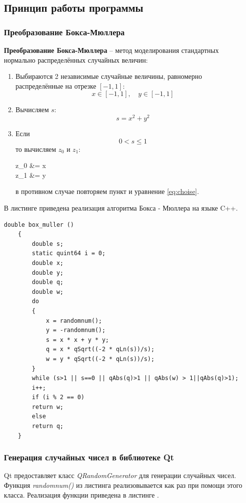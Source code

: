 \documentclass[../AISTR.tex]{subfiles}
\begin{document}
\subsection{Принцип работы программы}
\subsubsection{Преобразование Бокса-Мюллера}
\textbf{Преобразование Бокса-Мюллера} --  метод моделирования стандартных нормально распределённых случайных величин:
\begin{enumerate}
	\item \label{choise} Выбираются 2 независимые случайные величины, равномерно распределённые на отрезке $\left[-1, 1\right]$:
	\begin{equation}\label{eq:choise}
		x\in\left[-1, 1\right], \quad y\in\left[-1, 1\right]
	\end{equation}
	\item Вычисляем $s$:
	\begin{equation}
		s = x^2+y^2
	\end{equation}
	\item Если 
	\begin{equation}
		0<s\leq 1
	\end{equation}
	то вычисляем $z_0$ и $z_1$:
	\begin{aleq}
		z_0 &= x\\
		z_1 &= y
	\end{aleq}
	в противном случае повторяем пункт  и уравнение \eqref{eq:choise}.
\end{enumerate}

В листинге  приведена реализация алгоритма Бокса - Мюллера на языке C++.
\begin{lstlisting}[caption=Реализация алгоритма Бокса-Мюллера,captionpos=b, label={list:box_mueller}]
	double box_muller ()
	{
		double s;
		static quint64 i = 0;
		double x;
		double y;
		double q;
		double w;
		do
		{
			x = randomnum();
			y = -randomnum();
			s = x * x + y * y;
			q = x * qSqrt((-2 * qLn(s))/s);
			w = y * qSqrt((-2 * qLn(s))/s);
		}
		while (s>1 || s==0 || qAbs(q)>1 || qAbs(w) > 1||qAbs(q)>1);
		i++;
		if (i % 2 == 0)
		return w;
		else
		return q;
	}
\end{lstlisting}
\subsubsection{Генерация случайных чисел в библиотеке Qt}
Qt предоставляет класс \textit{QRandomGenerator} для генерации случайных чисел. Функция \textit{randomnum()} из листинга  реализовывается как раз при помощи этого класса. Реализация функции приведена в листинге .
\end{document}
